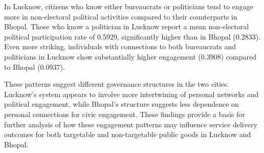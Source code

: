 In Lucknow, citizens who know either bureaucrats or politicians tend to engage more in non-electoral political activities compared to their counterparts in Bhopal. Those who know a politician in Lucknow report a mean non-electoral political participation rate of 0.5929, significantly higher than in Bhopal (0.2833). Even more striking, individuals with connections to both bureaucrats and politicians in Lucknow show substantially higher engagement (0.3908) compared to Bhopal (0.0937).

These patterns suggest different governance structures in the two cities. Lucknow's system appears to involve more intertwining of personal networks and political engagement, while Bhopal's structure suggests less dependence on personal connections for civic engagement. These findings provide a basis for further analysis of how these engagement patterns may influence service delivery outcomes for both targetable and non-targetable public goods in Lucknow and Bhopal.




